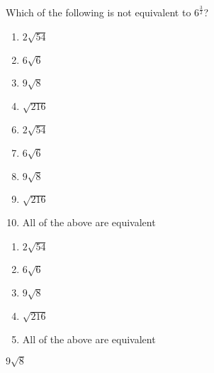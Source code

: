 

  Which of the following is not equivalent to $6^{\frac{3}{2}}$?


\ifsat
	\begin{enumerate}[label=\Alph*)]
		\item   $2\sqrt{54}$  
		\item   $6\sqrt{6}$ 
		\item  $9\sqrt{8}$ %
		\item  $\sqrt{216}$
	\end{enumerate}
\else
\fi

\ifacteven
	\begin{enumerate}[label=\textbf{\Alph*.},itemsep=\fill,align=left]
		\setcounter{enumii}{5}
		\item   $2\sqrt{54}$  
		\item   $6\sqrt{6}$ 
		\item  $9\sqrt{8}$ %
		\addtocounter{enumii}{1}
		\item  $\sqrt{216}$
		\item  All of the above are equivalent
	\end{enumerate}
\else
\fi

\ifactodd
	\begin{enumerate}[label=\textbf{\Alph*.},itemsep=\fill,align=left]
		\item   $2\sqrt{54}$  
		\item   $6\sqrt{6}$ 
		\item  $9\sqrt{8}$ %
		\item  $\sqrt{216}$
		\item  All of the above are equivalent
	\end{enumerate}
\else
\fi

\ifgridin
  $9\sqrt{8}$ %
		
\else
\fi

